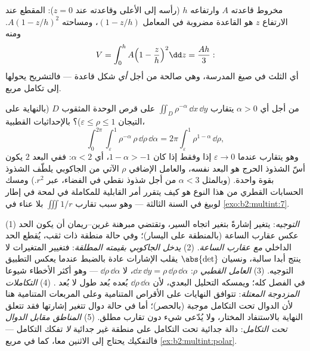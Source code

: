 \begin{example}\label{ex:b2:multint:cone}
مخروط  قاعدته $A$ وارتفاعه $h$ (رأسه إلى الأعلى وقاعدته
عند $z = 0$): المقطع عند الارتفاع $z$ هو القاعدة مضروبة في
المعامل $(1 -
z/h)$، ومساحته $A(1 - z/h)^2$. ومنه
\[
V = \int_0^h A\Bigl(1 - \frac zh\Bigr)^2\dd z = \frac{Ah}{3} :
\]
أي الثلث في صيغ المدرسة، وهي صالحة من أجل \emph{أي} شكل قاعدة ---
فالتشريح يحولها إلى تكامل مربع.
\end{example}

\begin{example}\label{ex:b2:multint:threshold}
من أجل أي $\alpha > 0$ يتقارب $\iint_{D}\rho^{-\alpha}\,\dd
x\,\dd y$ على قرص الوحدة المثقوب $D$
(بالنهاية على التيجان $\varepsilon \leq \rho \leq 1$)؟ بالإحداثيات القطبية،
\[
\int_0^{2\pi}\!\!\int_\varepsilon^1\rho^{-\alpha}\,
\rho\,\dd\rho\,\dd\alpha
= 2\pi\int_\varepsilon^1\rho^{1-\alpha}\,\dd\rho ,
\]
وهو يتقارب عندما $\varepsilon \to 0$ إذا وفقط إذا كان $1 - \alpha > -1$، أي $\alpha < 2$: ففي
البعد $2$ يكون أسّ الشذوذ الحرج هو البعد نفسه، والعامل الإضافي
$\rho$ الآتي من الجاكوبي يلطّف الشذوذ بقوة واحدة. (وبالمثل $\alpha < 3$
من أجل شذوذ نقطي في الفضاء، عبر $r^2$.) ومسك الحسابات القطري من
هذا النوع هو كيف يتقرر أمر القابلية للمكاملة في لمحة في إطار لوبيغ
في السنة الثالثة --- وهو سبب تقارب $\iiint 1/r$ بلا عناء في \cref{exo:b2:multint:7}.
\end{example}

\begin{remark}
(1) \emph{التوجيه}: يتغير  إشارةً بتغير اتجاه السير،
وتقتضي مبرهنة غرين--ريمان أن يكون الحد عكس عقارب الساعة (بالمنطقة
على اليسار)؛ وفي حالة منطقة ذات ثقب، يُقطع الحد الداخلي \emph{مع
عقارب الساعة}. (2) \emph{يدخل الجاكوبي بقيمته المطلقة}: فتغيير
المتغيرات لا ينتج أبدا  سالبة، ونسيان $\abs{\det}$ يقلب الإشارات
عادة بالضبط عندما يعكس التطبيق التوجيه. (3) \emph{العامل القطبي
$\rho$}: $\dd x\,\dd y = \rho\,\dd\rho\,\dd\alpha$، لا $\dd\rho\,\dd\alpha$ --- وهو أكثر الأخطاء شيوعا في الفصل
كله؛ ويمسكه التحليل البعدي، لأن $\dd\rho\,\dd\alpha$ بُعده بُعد طول لا بُعد
. (4) \emph{التكاملات المزدوجة المعتلة}: تتوافق النهايات على
الأقراص المتنامية وعلى المربعات المتنامية هنا لأن الدوال تحت التكامل
موجبة (بالحصر)؛ أما في حالة دوال تتغير إشارتها فقد تتعلق النهاية
بالاستنفاد المختار، ولا يُدّعى شيء دون تقارب مطلق. (5) \emph{المناطق
مقابل الدوال تحت التكامل}: دالة جدائية تحت التكامل على منطقة غير
جدائية \emph{لا} تفكك التكامل --- فالتفكيك يحتاج إلى الاثنين معا،
كما في مربع \cref{ex:b2:multint:polar}.
\end{remark}

